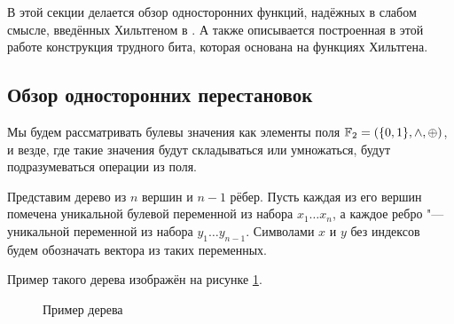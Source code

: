 \documentclass[a4paper, 14pt]{extarticle}
\begin{document}
В этой секции делается обзор односторонних функций, надёжных в слабом смысле,
введённых Хильтгеном в \cite{hiltgen1993}. А также описывается построенная в
этой работе конструкция трудного бита, которая основана на функциях Хильтгена.

\subsection{Обзор односторонних перестановок}

Мы будем рассматривать булевы значения как элементы поля ${\mathbb F}_2 = (\{0, 1\}, \land,
\oplus)$, и везде, где такие значения будут складываться или умножаться, будут
подразумеваться операции из поля.

Представим дерево из $n$ вершин и $n - 1$ рёбер. Пусть каждая из его вершин
помечена уникальной булевой переменной из набора $x_1 \dots x_n$, а каждое ребро
"--- уникальной переменной из набора $y_1 \dots y_{n-1}$. Символами $x$ и $y$ без
индексов будем обозначать вектора из таких переменных.

Пример такого дерева изображён на рисунке \ref{fig_tree}.

\begin{figure}[h]
\centering
{}
\caption{Пример дерева}
\label{fig_tree}
\end{figure}
\end{document}
